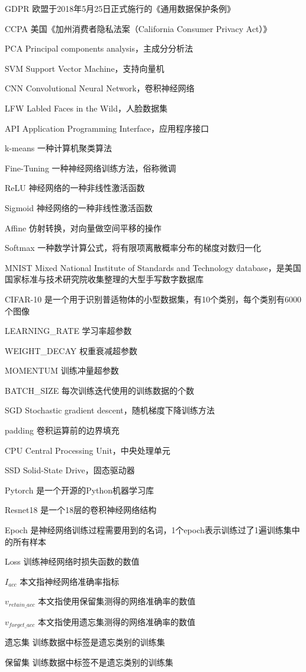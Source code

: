 
\begin{denotation}[3cm]
  \item[GDPR] 欧盟于2018年5月25日正式施行的《通用数据保护条例》
  \item[CCPA] 美国《加州消费者隐私法案（California Consumer Privacy Act）》 
  \item[PCA] Principal components analysis，主成分分析法
  \item[SVM] Support Vector Machine，支持向量机
  \item[CNN] Convolutional Neural Network，卷积神经网络
  \item[LFW] Labled Faces in the Wild，人脸数据集
  \item[API] Application Programming Interface，应用程序接口
  \item[k-means] 一种计算机聚类算法
  \item[Fine-Tuning] 一种神经网络训练方法，俗称微调
  \item[ReLU] 神经网络的一种非线性激活函数
  \item[Sigmoid] 神经网络的一种非线性激活函数
  \item[Affine] 仿射转换，对向量做空间平移的操作
  \item[Softmax] 一种数学计算公式，将有限项离散概率分布的梯度对数归一化
  \item[MNIST] Mixed National Institute of Standards and Technology database，是美国国家标准与技术研究院收集整理的大型手写数字数据库
  \item[CIFAR-10] 是一个用于识别普适物体的小型数据集，有10个类别，每个类别有6000个图像
  \item[LEARNING\_RATE] 学习率超参数
  \item[WEIGHT\_DECAY] 权重衰减超参数
  \item[MOMENTUM] 训练冲量超参数  
  \item[BATCH\_SIZE] 每次训练迭代使用的训练数据的个数
  \item[SGD]   Stochastic gradient descent，随机梯度下降训练方法
  \item[padding] 卷积运算前的边界填充
  \item[CPU] Central Processing Unit，中央处理单元
  \item[SSD] Solid-State Drive，固态驱动器
  \item[Pytorch] 是一个开源的Python机器学习库
  \item[Resnet18] 是一个18层的卷积神经网络结构
  \item[Epoch] 是神经网络训练过程需要用到的名词，1个epoch表示训练过了1遍训练集中的所有样本
  \item[Loss] 训练神经网络时损失函数的数值
  \item[$I_{acc}$] 本文指神经网络准确率指标
  \item[$v_{retain\_acc}$] 本文指使用保留集测得的网络准确率的数值
  \item[$v_{forget\_acc}$] 本文指使用遗忘集测得的网络准确率的数值
  \item[遗忘集] 训练数据中标签是遗忘类别的训练集 
  \item[保留集]  训练数据中标签不是遗忘类别的训练集
\end{denotation}



